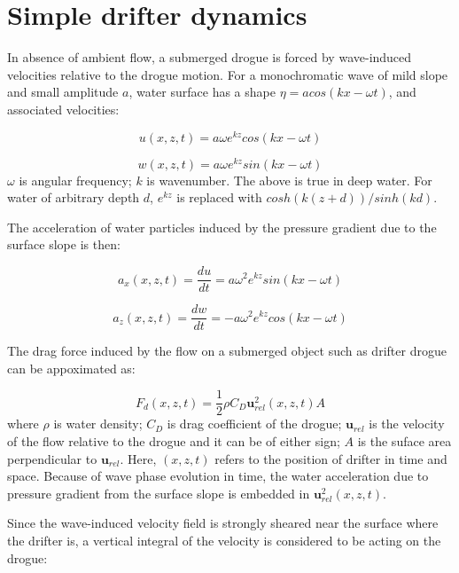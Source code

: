 \documentclass[12pt,letterpaper]{article}
\begin{document}
\doublespacing

\section{Simple drifter dynamics}

In absence of ambient flow, a submerged drogue is forced by 
wave-induced velocities relative to the drogue motion.
For a monochromatic wave of mild slope and small amplitude $a$,
water surface has a shape $\eta = acos{(kx - \omega t)}$, 
and associated velocities:

\begin{equation}
u(x,z,t) = a \omega e^{kz} cos{(kx-\omega t)}
\end{equation}

\begin{equation}
w(x,z,t) = a \omega e^{kz} sin{(kx-\omega t)}
\end{equation}
$\omega$ is angular frequency; $k$ is wavenumber.
The above is true in deep water. For water of arbitrary depth $d$,
$e^{kz}$ is replaced with $cosh(k(z+d))/sinh(kd)$.

The acceleration of water particles induced by the pressure gradient
due to the surface slope is then:

\begin{equation}
a_x(x,z,t) = \dfrac{du}{dt} = a \omega^2 e^{kz} sin{(kx-\omega t)}
\end{equation}

\begin{equation}
a_z(x,z,t) = \dfrac{dw}{dt} = -a \omega^2 e^{kz} cos{(kx-\omega t)}
\end{equation}

The drag force induced by the flow on a submerged object such as drifter drogue
can be appoximated as:

\begin{equation}
F_d(x,z,t) = \dfrac{1}{2} \rho C_D \mathbf{u}_{rel}^2(x,z,t) A 
\end{equation}
where $\rho$ is water density; $C_D$ is drag coefficient of the drogue;
$\mathbf{u}_{rel}$ is the velocity of the flow relative to the drogue 
and it can be of either sign;
$A$ is the suface area perpendicular to $\mathbf{u}_{rel}$.
Here, $(x,z,t)$ refers to the position of drifter in time and space.
Because of wave phase evolution in time, the water acceleration due 
to pressure gradient from the surface slope is embedded in 
$\mathbf{u}_{rel}^2(x,z,t)$.

Since the wave-induced velocity field is strongly sheared near the surface
where the drifter is, a vertical integral of the velocity is considered to be 
acting on the drogue:
\end{document}
